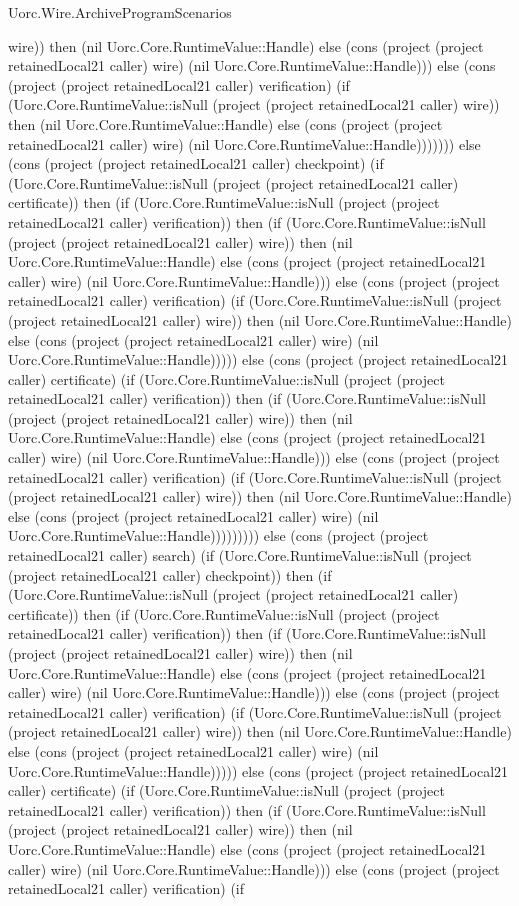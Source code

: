 \begin{lexlean}{Uorc.Wire.ArchiveProgramScenarios}
\begin{semanticmodule}
{wire)) then (nil Uorc.Core.RuntimeValue::Handle) else (cons (project (project retainedLocal21 caller) wire) (nil Uorc.Core.RuntimeValue::Handle))) else (cons (project (project retainedLocal21 caller) verification) (if (Uorc.Core.RuntimeValue::isNull (project (project retainedLocal21 caller) wire)) then (nil Uorc.Core.RuntimeValue::Handle) else (cons (project (project retainedLocal21 caller) wire) (nil Uorc.Core.RuntimeValue::Handle))))))) else (cons (project (project retainedLocal21 caller) checkpoint) (if (Uorc.Core.RuntimeValue::isNull (project (project retainedLocal21 caller) certificate)) then (if (Uorc.Core.RuntimeValue::isNull (project (project retainedLocal21 caller) verification)) then (if (Uorc.Core.RuntimeValue::isNull (project (project retainedLocal21 caller) wire)) then (nil Uorc.Core.RuntimeValue::Handle) else (cons (project (project retainedLocal21 caller) wire) (nil Uorc.Core.RuntimeValue::Handle))) else (cons (project (project retainedLocal21 caller) verification) (if (Uorc.Core.RuntimeValue::isNull (project (project retainedLocal21 caller) wire)) then (nil Uorc.Core.RuntimeValue::Handle) else (cons (project (project retainedLocal21 caller) wire) (nil Uorc.Core.RuntimeValue::Handle))))) else (cons (project (project retainedLocal21 caller) certificate) (if (Uorc.Core.RuntimeValue::isNull (project (project retainedLocal21 caller) verification)) then (if (Uorc.Core.RuntimeValue::isNull (project (project retainedLocal21 caller) wire)) then (nil Uorc.Core.RuntimeValue::Handle) else (cons (project (project retainedLocal21 caller) wire) (nil Uorc.Core.RuntimeValue::Handle))) else (cons (project (project retainedLocal21 caller) verification) (if (Uorc.Core.RuntimeValue::isNull (project (project retainedLocal21 caller) wire)) then (nil Uorc.Core.RuntimeValue::Handle) else (cons (project (project retainedLocal21 caller) wire) (nil Uorc.Core.RuntimeValue::Handle))))))))) else (cons (project (project retainedLocal21 caller) search) (if (Uorc.Core.RuntimeValue::isNull (project (project retainedLocal21 caller) checkpoint)) then (if (Uorc.Core.RuntimeValue::isNull (project (project retainedLocal21 caller) certificate)) then (if (Uorc.Core.RuntimeValue::isNull (project (project retainedLocal21 caller) verification)) then (if (Uorc.Core.RuntimeValue::isNull (project (project retainedLocal21 caller) wire)) then (nil Uorc.Core.RuntimeValue::Handle) else (cons (project (project retainedLocal21 caller) wire) (nil Uorc.Core.RuntimeValue::Handle))) else (cons (project (project retainedLocal21 caller) verification) (if (Uorc.Core.RuntimeValue::isNull (project (project retainedLocal21 caller) wire)) then (nil Uorc.Core.RuntimeValue::Handle) else (cons (project (project retainedLocal21 caller) wire) (nil Uorc.Core.RuntimeValue::Handle))))) else (cons (project (project retainedLocal21 caller) certificate) (if (Uorc.Core.RuntimeValue::isNull (project (project retainedLocal21 caller) verification)) then (if (Uorc.Core.RuntimeValue::isNull (project (project retainedLocal21 caller) wire)) then (nil Uorc.Core.RuntimeValue::Handle) else (cons (project (project retainedLocal21 caller) wire) (nil Uorc.Core.RuntimeValue::Handle))) else (cons (project (project retainedLocal21 caller) verification) (if }
\end{semanticmodule}
\end{lexlean}
